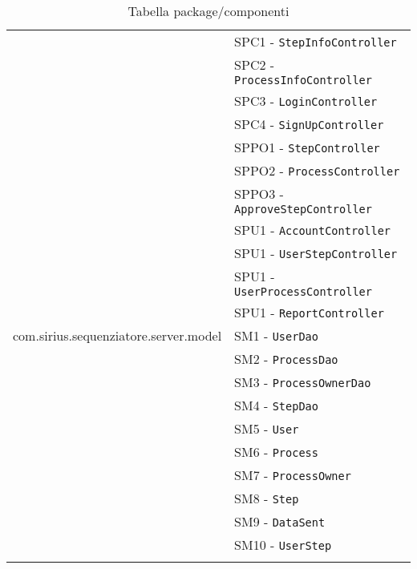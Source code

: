 \begin{longtable}{XX}
\sCommon{}&SPC1 - \texttt{StepInfoController}\\
		&SPC2 - \texttt{ProcessInfoController}\\
		&SPC3 - \texttt{LoginController}\\
		&SPC4 - \texttt{SignUpController}\\
\midrule

\sProcessOwner{}&SPPO1 - \texttt{StepController}\\
&SPPO2 - \texttt{ProcessController}\\
&SPPO3 - \texttt{ApproveStepController}\\
\midrule
\sUser{}&SPU1 - \texttt{AccountController}\\
&SPU1 - \texttt{UserStepController}\\
&SPU1 - \texttt{UserProcessController}\\
&SPU1 - \texttt{ReportController}\\
\midrule

com.sirius.sequenziatore.server.model
&SM1 - \texttt{UserDao}\\
&SM2 - \texttt{ProcessDao}\\
&SM3 - \texttt{ProcessOwnerDao}\\
&SM4 - \texttt{StepDao}\\
&SM5 - \texttt{User}\\
&SM6 - \texttt{Process}\\
&SM7 - \texttt{ProcessOwner}\\
&SM8 - \texttt{Step}\\
&SM9 - \texttt{DataSent}\\
&SM10 - \texttt{UserStep}\\
\midrule

\bottomrule
\caption{Tabella package/componenti}
\end{longtable}
